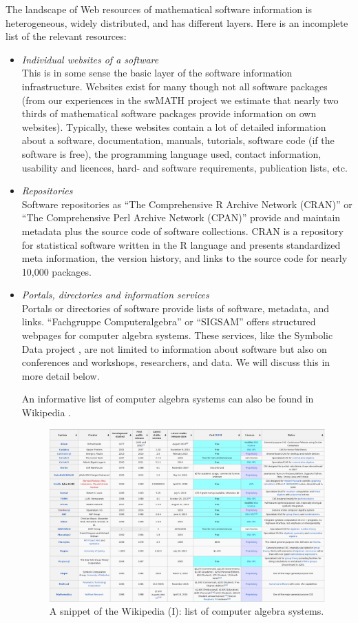 \documentclass[12pt]{article}
\begin{document}
The landscape of Web resources of mathematical software information is
heterogeneous, widely distributed, and has different layers.  Here is an
incomplete list of the relevant resources:
\begin{itemize}
\item{\textit{Individual websites of a software}}\\ This is in some sense the
  basic layer of the software information infrastructure. Websites exist for
  many though not all software packages (from our experiences in the swMATH
  project we estimate that nearly two thirds of mathematical software packages
  provide information on own websites). Typically, these websites contain a lot
  of detailed information about a software, documentation, manuals, tutorials,
  software code (if the software is free), the programming language used,
  contact information, usability and licences, hard- and software requirements,
  publication lists, etc.
\item{\textit{Repositories}}\\ Software repositories as ``The Comprehensive R
  Archive Network (CRAN)'' \cite{CRAN} or ``The Comprehensive Perl Archive
  Network (CPAN)'' \cite{CPAN} provide and maintain metadata plus the source
  code of software collections. CRAN is a repository for statistical software
  written in the R language and presents standardized meta information, the
  version history, and links to the source code for nearly 10,000 packages.
\item{\textit{Portals, directories and information services}}\\ Portals or
  directories of software provide lists of software, metadata, and
  links. ``Fachgruppe Computeralgebra'' \cite{FAG} or ``SIGSAM'' \cite{SIGSAM}
  offers structured webpages for computer algebra systems. These services, like
  the Symbolic Data project \cite{SD}, are not limited to information about
  software but also on conferences and workshops, researchers, and data. We
  will discuss this in more detail below.

An informative list of computer algebra systems can also be found in Wikipedia
\cite{WikipediaCAS}.

\begin{figure}[ht]
  \centering
  \includegraphics[width=.9\textwidth]{aca3}
  \caption{A snippet of the Wikipedia (I): list of computer algebra
    systems.\label{abb_3}}
\end{figure}


\end{itemize}
\end{document}
